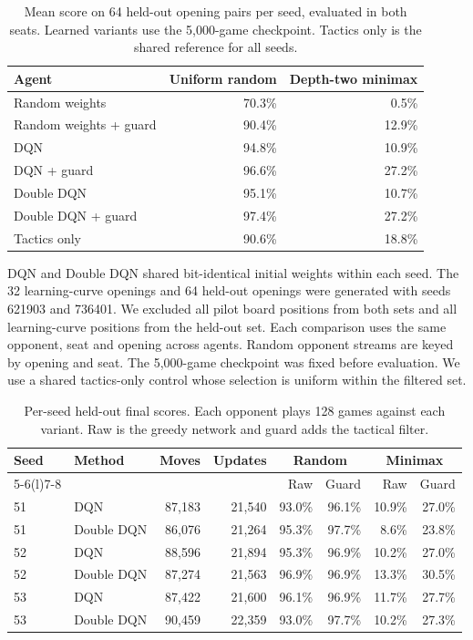 \documentclass[letterpaper]{article}
\begin{document}
\begin{table}[!htbp]
\centering\small
\caption{Mean score on 64 held-out opening pairs per seed, evaluated in both
seats. Learned variants use the 5,000-game checkpoint. Tactics only is the
shared reference for all seeds.}
\label{tab:q-final}
\begin{tabular}{@{}lrr@{}}
\toprule
Agent & Uniform random & Depth-two minimax\\
\midrule
Random weights & 70.3\% & 0.5\%\\
Random weights + guard & 90.4\% & 12.9\%\\
DQN & 94.8\% & 10.9\%\\
DQN + guard & 96.6\% & 27.2\%\\
Double DQN & 95.1\% & 10.7\%\\
Double DQN + guard & 97.4\% & 27.2\%\\
Tactics only & 90.6\% & 18.8\%\\
\bottomrule
\end{tabular}
\end{table}

DQN and Double DQN shared bit-identical initial weights within each seed.
The 32 learning-curve openings and 64 held-out openings were generated with
seeds 621903 and 736401. We excluded all pilot board positions from both sets
and all learning-curve positions from the held-out set. Each comparison uses
the same opponent, seat and opening across agents. Random opponent streams
are keyed by opening and seat. The 5,000-game checkpoint was fixed before
evaluation. We use a shared tactics-only control whose selection is uniform
within the filtered set.

\begin{table}[!htbp]
\centering\small
\caption{Per-seed held-out final scores. Each opponent plays 128 games against
each variant. Raw is the greedy network and guard adds the tactical filter.}
\begin{tabular}{@{}llrrrrrr@{}}
\toprule
Seed & Method & Moves & Updates & \multicolumn{2}{c}{Random} & \multicolumn{2}{c}{Minimax}\\
\cmidrule(lr){5-6}\cmidrule(l){7-8}
 & & & & Raw & Guard & Raw & Guard\\
\midrule
51 & DQN & 87,183 & 21,540 & 93.0\% & 96.1\% & 10.9\% & 27.0\%\\
51 & Double DQN & 86,076 & 21,264 & 95.3\% & 97.7\% & 8.6\% & 23.8\%\\
52 & DQN & 88,596 & 21,894 & 95.3\% & 96.9\% & 10.2\% & 27.0\%\\
52 & Double DQN & 87,274 & 21,563 & 96.9\% & 96.9\% & 13.3\% & 30.5\%\\
53 & DQN & 87,422 & 21,600 & 96.1\% & 96.9\% & 11.7\% & 27.7\%\\
53 & Double DQN & 90,459 & 22,359 & 93.0\% & 97.7\% & 10.2\% & 27.3\%\\
\bottomrule
\end{tabular}
\end{table}
\end{document}
